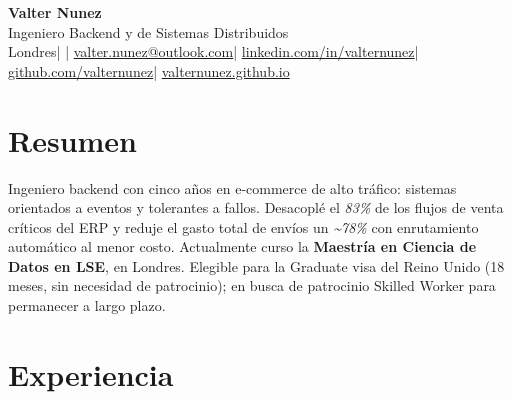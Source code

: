 \documentclass[10pt,a4paper]{article}
\begin{document}
{\Huge\bfseries Valter Nunez}\\[3pt]
{\color{soft}\large Ingeniero Backend y de Sistemas Distribuidos}\\[5pt]
{\footnotesize
Londres\hspace{0.5em}\textcolor{soft}{|}\hspace{0.5em}%
\ifdefined\cvphone\href{tel:\cvphonetel}{\cvphone}\hspace{0.5em}\textcolor{soft}{|}\hspace{0.5em}\fi%
\href{mailto:valter.nunez@outlook.com}{valter.nunez@outlook.com}\hspace{0.5em}\textcolor{soft}{|}\hspace{0.5em}%
\href{https://www.linkedin.com/in/valternunez}{linkedin.com/in/valternunez}\hspace{0.5em}\textcolor{soft}{|}\hspace{0.5em}%
\href{https://github.com/valternunez}{github.com/valternunez}\hspace{0.5em}\textcolor{soft}{|}\hspace{0.5em}%
\href{https://valternunez.github.io}{valternunez.github.io}
}

\section*{Resumen}
Ingeniero backend con cinco años en e-commerce de alto tráfico: sistemas orientados a
eventos y tolerantes a fallos. Desacoplé el \textit{83\%} de los flujos de venta críticos del ERP y
reduje el gasto total de envíos un \textit{\textasciitilde78\%} con enrutamiento automático al menor
costo. Actualmente curso la \textbf{Maestría en Ciencia de Datos en LSE}, en Londres. Elegible para
la Graduate visa del Reino Unido (18 meses, sin necesidad de patrocinio); en busca de patrocinio Skilled Worker para permanecer a largo plazo.

\section*{Experiencia}
\end{document}
